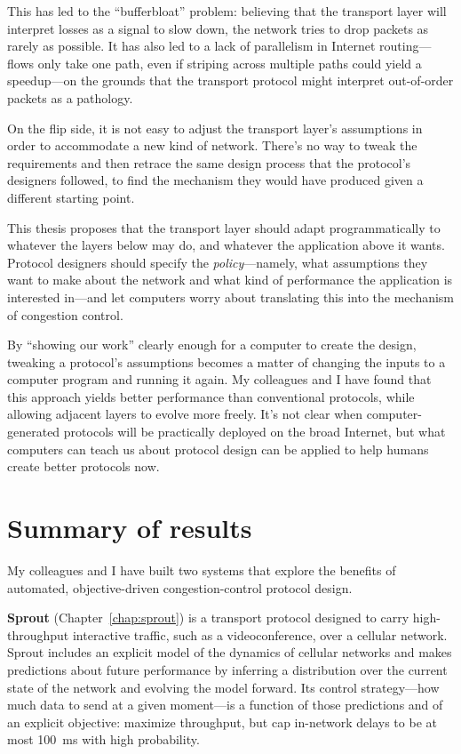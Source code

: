 This has led to the ``bufferbloat''\cite{bufferbloat} problem:
believing that the transport layer will interpret losses as a signal
to slow down, the network tries to drop packets as rarely as
possible. It has also led to a lack of parallelism in Internet
routing---flows only take one path, even if striping across
multiple paths could yield a speedup---on the grounds that the
transport protocol might interpret out-of-order packets as a
pathology.

On the flip side, it is not easy to adjust the transport
layer's assumptions in order to accommodate a new kind of
network. There's no way to tweak the requirements and then retrace the
same design process that the protocol's designers followed, to find the
mechanism they would have produced given a different starting point.


This thesis proposes that the transport layer should adapt
programmatically to whatever the layers below may do, and whatever the
application above it wants. Protocol designers should specify the
\emph{policy}---namely, what assumptions they want to make about the
network and what kind of performance the application is interested
in---and let computers worry about translating this into the mechanism
of congestion control.

By ``showing our work'' clearly enough for a computer to create the
design, tweaking a protocol's assumptions becomes a matter of changing
the inputs to a computer program and running it again. My colleagues
and I have found that this approach yields better performance than
conventional protocols, while allowing adjacent layers to evolve more
freely. It's not clear when computer-generated protocols will be
practically deployed on the broad Internet, but what computers can
teach us about protocol design can be applied to help humans create
better protocols now.

\section{Summary of results}

My colleagues and I have built two systems that explore the benefits
of automated, objective-driven congestion-control protocol design.

\textbf{Sprout} (Chapter~\ref{chap:sprout}) is a transport protocol
designed to carry high-throughput interactive traffic, such as a
videoconference, over a cellular network. Sprout includes an explicit
model of the dynamics of cellular networks and makes predictions about
future performance by inferring a distribution over the current state
of the network and evolving the model forward. Its control
strategy---how much data to send at a given moment---is a function of
those predictions and of an explicit objective: maximize throughput,
but cap in-network delays to be at most 100~ms with high
probability.

